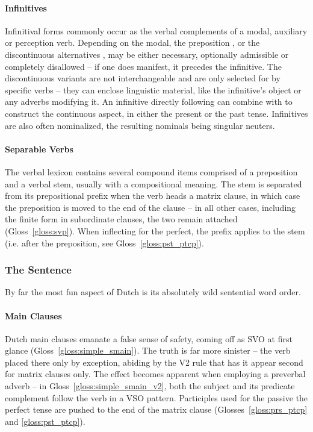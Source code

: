 \paragraph{Infinitives}
Infinitival forms commonly occur as the verbal complements of a modal, auxiliary or perception verb.
Depending on the modal, the preposition , or the discontinuous alternatives , may be either necessary, optionally admissible or completely disallowed -- if one does manifest, it precedes the infinitive.
The discontinuous variants are not interchangeable and are only selected for by specific verbs -- they can enclose linguistic material, like the infinitive's object or any adverbs modifying it.
An infinitive directly following  can combine with  to construct the continuous aspect, in either the present or the past tense.
Infinitives are also often nominalized, the resulting nominals being singular neuters.

\paragraph{Separable Verbs} 
The verbal lexicon contains several compound items comprised of a preposition and a verbal stem, usually with a compositional meaning.
The stem is separated from its prepositional prefix when the verb heads a matrix clause, in which case the preposition is moved to the end of the clause -- in all other cases, including the finite form in subordinate clauses, the two remain attached (Gloss~\ref{gloss:svp}).
When inflecting for the perfect, the prefix applies to the stem (i.e. after the preposition, see Gloss~\ref{gloss:pst_ptcp}).

\subsubsection{The Sentence}
By far the most fun aspect of Dutch is its absolutely wild sentential word order.

\paragraph{Main Clauses}
Dutch main clauses emanate a false sense of safety, coming off as SVO at first glance (Gloss~\ref{gloss:simple_smain}).
The truth is far more sinister -- the verb placed there only by exception, abiding by the V2 rule that has it appear second for matrix clauses only.
The effect becomes apparent when employing a preverbal adverb -- in Gloss~\ref{gloss:simple_smain_v2}, both the subject and its predicate complement follow the verb in a VSO pattern.
Participles used for the passive the perfect tense are pushed to the end of the matrix clause (Glosses~\ref{gloss:prs_ptcp} and \ref{gloss:pst_ptcp}).

